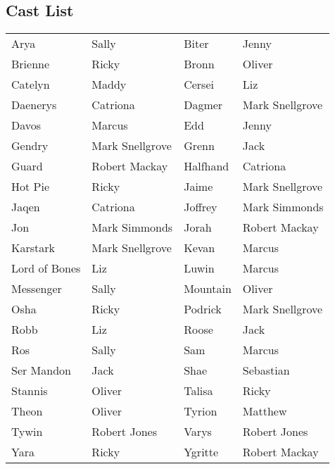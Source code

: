 \subsection*{Cast List}
\begin{tabular}{ll|ll}\\
Arya & Sally &  Biter & Jenny\\
Brienne & Ricky &  Bronn & Oliver\\
Catelyn & Maddy &  Cersei & Liz\\
Daenerys & Catriona &  Dagmer & Mark Snellgrove\\
Davos & Marcus &  Edd & Jenny\\
Gendry & Mark Snellgrove &  Grenn & Jack\\
Guard & Robert Mackay &  Halfhand & Catriona\\
Hot Pie & Ricky &  Jaime & Mark Snellgrove\\
Jaqen & Catriona &  Joffrey & Mark Simmonds\\
Jon & Mark Simmonds &  Jorah & Robert Mackay\\
Karstark & Mark Snellgrove &  Kevan & Marcus\\
Lord of Bones & Liz &  Luwin & Marcus\\
Messenger & Sally           & Mountain & Oliver\\
Osha & Ricky         & Podrick   & Mark Snellgrove \\
Robb & Liz           & Roose     & Jack            \\
Ros & Sally          & Sam       & Marcus          \\
Ser Mandon & Jack    & Shae      & Sebastian       \\
Stannis & Oliver     & Talisa    & Ricky           \\
Theon & Oliver       & Tyrion    & Matthew         \\
Tywin & Robert Jones & Varys     & Robert Jones    \\
Yara & Ricky         & Ygritte   & Robert Mackay   
\end{tabular}
